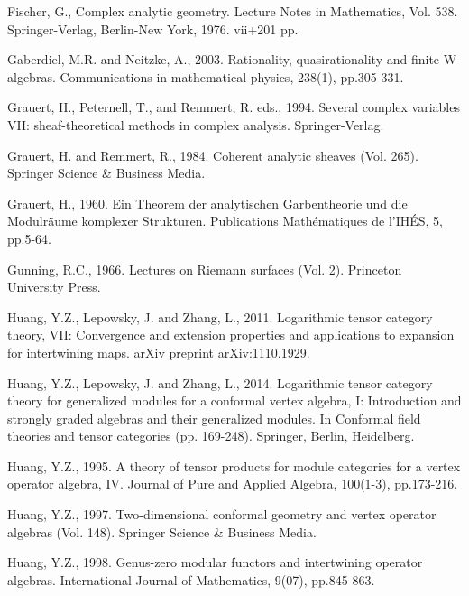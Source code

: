 \documentclass[12pt,a4paper,notitlepage]{article}
\theoremstyle{definition}
\theoremstyle{plain}
\numberwithin{equation}{section}
\begin{document}
\begin{thebibliography}{999999}
		Fischer, G., Complex analytic geometry. Lecture Notes in Mathematics, Vol. 538. Springer-Verlag, Berlin-New York, 1976. vii+201 pp.
		
		

Gaberdiel, M.R. and Neitzke, A., 2003. Rationality, quasirationality and finite W-algebras. Communications in mathematical physics, 238(1), pp.305-331.
		
		Grauert, H., Peternell, T., and Remmert, R. eds., 1994. Several complex variables VII: sheaf-theoretical methods in complex analysis. Springer-Verlag.
		
		Grauert, H. and Remmert, R., 1984. Coherent analytic sheaves (Vol. 265). Springer Science \& Business Media.
		
		Grauert, H., 1960. Ein Theorem der analytischen Garbentheorie und die Modulr\"aume komplexer Strukturen. Publications Math\'ematiques de l'IH\'ES, 5, pp.5-64.
		
Gunning, R.C., 1966. Lectures on Riemann surfaces (Vol. 2). Princeton University Press.

Huang, Y.Z., Lepowsky, J. and Zhang, L., 2011. Logarithmic tensor category theory, VII: Convergence and extension properties and applications to expansion for intertwining maps. arXiv preprint arXiv:1110.1929.

Huang, Y.Z., Lepowsky, J. and Zhang, L., 2014. Logarithmic tensor category theory for generalized modules for a conformal vertex algebra, I: Introduction and strongly graded algebras and their generalized modules. In Conformal field theories and tensor categories (pp. 169-248). Springer, Berlin, Heidelberg.
	
Huang, Y.Z., 1995. A theory of tensor products for module categories for a vertex operator algebra, IV. Journal of Pure and Applied Algebra, 100(1-3), pp.173-216.	

		
		Huang, Y.Z., 1997. Two-dimensional conformal geometry and vertex operator algebras (Vol. 148). Springer Science \& Business Media.
		

Huang, Y.Z., 1998. Genus-zero modular functors and intertwining operator algebras. International Journal of Mathematics, 9(07), pp.845-863.		
		

\end{thebibliography}
\end{document}
